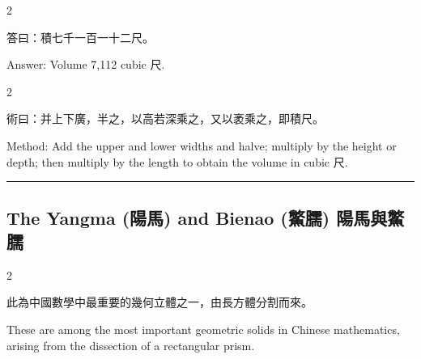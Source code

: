 \documentclass[10pt,a4paper]{article}
\newcommand{\longline}{\noindent\rule{\textwidth}{0.4pt}}
\begin{document}
\begin{paracol}{2}

\begin{leftcolumn*}
\begin{answerbi}[\textbf{答}]
答曰：積七千一百一十二尺。
\end{answerbi}
\end{leftcolumn*}

\begin{rightcolumn*}
\begin{answerbi}
Answer: Volume 7,112 cubic 尺.
\end{answerbi}
\end{rightcolumn*}

\end{paracol}

\begin{paracol}{2}

\begin{leftcolumn*}
\begin{methodbi}[\textbf{術}]
術曰：并上下廣，半之，以高若深乘之，又以袤乘之，即積尺。
\end{methodbi}
\end{leftcolumn*}

\begin{rightcolumn*}
\begin{methodbi}
Method: Add the upper and lower widths and halve; multiply by the height or depth; then multiply by the length to obtain the volume in cubic 尺.
\end{methodbi}
\end{rightcolumn*}

\end{paracol}

\vspace{0.3cm}
\longline
\vspace{0.3cm}

\subsection{The Yangma (陽馬) and Bienao (鱉臑) 陽馬與鱉臑}

\begin{paracol}{2}
\begin{leftcolumn*}
此為中國數學中最重要的幾何立體之一，由長方體分割而來。
\end{leftcolumn*}
\begin{rightcolumn*}
These are among the most important geometric solids in Chinese mathematics, arising from the dissection of a rectangular prism.
\end{rightcolumn*}
\end{paracol}
\end{document}
